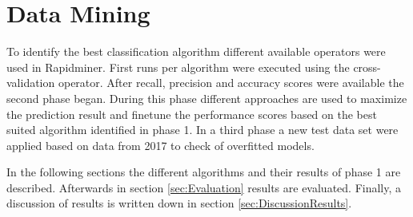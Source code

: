 \section{Data Mining}

To identify the best classification algorithm different available operators were used in Rapidminer.
First runs per algorithm were executed using the cross-validation operator. After recall, precision and accuracy scores were available the second phase began. During this phase different approaches are used to maximize the prediction result and finetune the performance scores based on the best suited algorithm identified in phase 1. In a third phase a new test data set were applied based on data from 2017 to check of overfitted models. \newline

In the following sections the different algorithms and their results of phase 1 are described. 
Afterwards in section \ref{sec:Evaluation} results are evaluated.
Finally, a discussion of results is written down in section \ref{sec:DiscussionResults}. 










